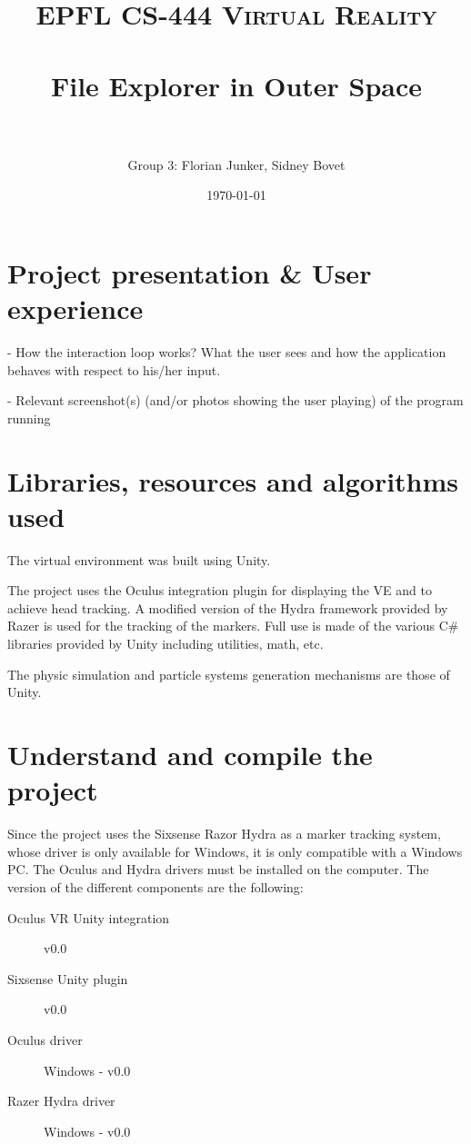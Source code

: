 \documentclass[paper=a4, fontsize=11pt]{scrartcl} %
\title{
  \normalfont \normalsize
  \textsc{EPFL CS-444 Virtual Reality} \\ [25pt] %
  \horrule{0.5pt} \\[0.4cm] %
  \huge File Explorer in Outer Space \\ %
  \horrule{2pt} \\[0.5cm] %
}
\author{Group 3: Florian Junker, Sidney Bovet} %
\date{\normalsize\today} %
\numberwithin{equation}{section} %
\numberwithin{figure}{section} %
\numberwithin{table}{section} %
\begin{document}
\maketitle %




\section{Project presentation \& User experience}
- How the interaction loop works? What the user sees and how the application behaves with respect to his/her input.

- Relevant screenshot(s) (and/or photos showing the user playing) of the program running


\section{Libraries, resources and algorithms used}
The virtual environment was built using Unity.

The project uses the Oculus integration plugin for displaying the VE and to achieve head tracking. A modified version of the Hydra framework provided by Razer is used for the tracking of the markers. Full use is made of the various C\# libraries provided by Unity including utilities, math, etc.

The physic simulation and particle systems generation mechanisms are those of Unity.


\section{Understand and compile the project}
Since the project uses the Sixsense Razor Hydra as a marker tracking system, whose driver is only available for Windows, it is only compatible with a Windows PC. The Oculus and Hydra drivers must be installed on the computer. The version of the different components are the following:
\begin{description}
\item[Oculus VR Unity integration] v0.0
\item[Sixsense Unity plugin] v0.0
\item[Oculus driver] Windows - v0.0
\item[Razer Hydra driver] Windows - v0.0
\end{description}
\end{document}
